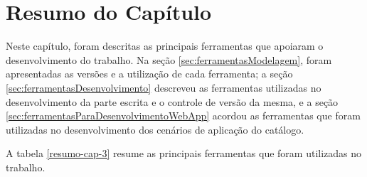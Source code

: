 \section*{Resumo do Capítulo}

Neste capítulo, foram descritas as principais ferramentas que apoiaram o desenvolvimento do trabalho. Na seção \ref{sec:ferramentasModelagem}, foram apresentadas as versões e a utilização de cada ferramenta; a seção \ref{sec:ferramentasDesenvolvimento} descreveu as ferramentas utilizadas no desenvolvimento da parte escrita e o controle de versão da mesma, e a seção \ref{sec:ferramentasParaDesenvolvimentoWebApp} acordou as ferramentas que foram utilizadas no desenvolvimento dos cenários de aplicação do catálogo. 


A tabela \ref{resumo-cap-3} resume as principais ferramentas que foram utilizadas no trabalho.

